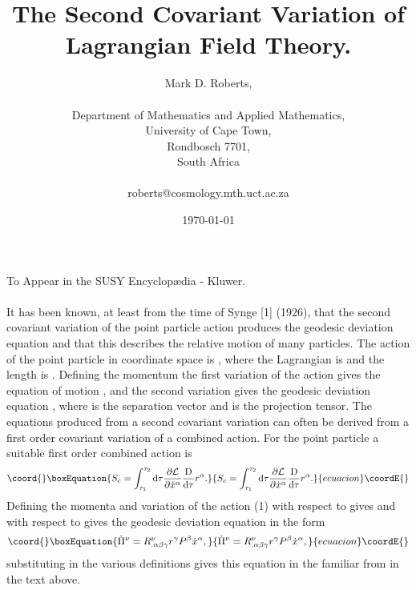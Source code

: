 \documentclass[a4paper,a4paper]{article}
\begin{document}
\title{The Second Covariant Variation of Lagrangian Field Theory.}
\author{Mark D. Roberts, \\\\
Department of Mathematics and Applied Mathematics, \\ 
University of Cape Town,\\
Rondbosch 7701,\\
South Africa\\\\
roberts@cosmology.mth.uct.ac.za} 
\date{\today}
\maketitle
To Appear in the SUSY Encyclop{\ae}dia - Kluwer.\\\\
It has been known,  at least from the time of Synge [1] (1926),
that the second covariant variation of the point particle action
produces the geodesic deviation equation and that this describes the relative
motion of many particles.   The action of the point particle in coordinate
space is 
\coordHE{},
where the Lagrangian is 
\coordHE{}
and the length is
\coordHE{}.
Defining the momentum
\coordHE{}
the first variation of the action gives the equation of motion
\coordHE{},
and the second variation gives the geodesic deviation equation
\coordHE{},
where \coordHE{} is the separation vector and 
\coordHE{}
is the projection tensor.   The equations produced from a second covariant
variation can often be derived from a first order covariant variation of 
a combined action.   
For the point particle a suitable first order combined action is
\begin{equation}\coord{}\boxEquation{
S_c=\int^{\tau_2}_{\tau_1}{\rm d}\tau
\frac{\partial{\cal{L}}}{\partial\dot{x}^\alpha}
\frac{{\rm D}}{{\rm d}\tau}r^\alpha.
}{
S_c=\int^{\tau_2}_{\tau_1}{\rm d}\tau
\frac{\partial{\cal{L}}}{\partial\dot{x}^\alpha}
\frac{{\rm D}}{{\rm d}\tau}r^\alpha.
}{ecuacion}\coordE{}\end{equation}
Defining the momenta
\coordHE{}
and
\coordHE{}
variation of the action (1) with respect to \coordHE{} gives 
\coordHE{} and with respect to \coordHE{} 
gives the geodesic deviation equation in the form
\begin{equation}\coord{}\boxEquation{
\dot{\Pi}^\nu=R^\nu_{.\alpha\beta\gamma}r^\gamma P^\beta\dot{x}^\alpha,
}{
\dot{\Pi}^\nu=R^\nu_{.\alpha\beta\gamma}r^\gamma P^\beta\dot{x}^\alpha,
}{ecuacion}\coordE{}\end{equation}
substituting in the various definitions gives this equation 
in the familiar from in the text above.
\end{document}

